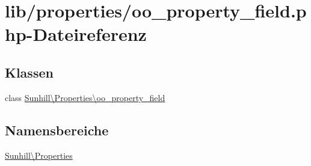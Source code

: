\hypertarget{oo__property__field_8php}{}\section{lib/properties/oo\+\_\+property\+\_\+field.php-\/\+Dateireferenz}
\label{oo__property__field_8php}
\subsection*{Klassen}
\begin{DoxyCompactItemize}
\item 
class \hyperlink{classSunhill_1_1Properties_1_1oo__property__field}{Sunhill\textbackslash{}\+Properties\textbackslash{}oo\+\_\+property\+\_\+field}
\end{DoxyCompactItemize}
\subsection*{Namensbereiche}
\begin{DoxyCompactItemize}
\item 
 \hyperlink{namespaceSunhill_1_1Properties}{Sunhill\textbackslash{}\+Properties}
\end{DoxyCompactItemize}
